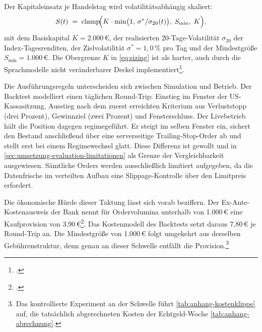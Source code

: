 Der Kapitaleinsatz je Handelstag wird volatilitätsabhängig skaliert:
\begin{equation}
  S(t) \;=\; \operatorname{clamp}\!\Bigl(K \cdot \min\bigl(1,\,
  \sigma^{*}/\sigma_{20}(t)\bigr),\; S_{\min},\; K\Bigr),
  \label{eq:sizing}
\end{equation}
mit dem Basiskapital $K = 2.000\,€$, der realisierten
20-Tage-Volatilität $\sigma_{20}$ der Index-Tagesrenditen, der Zielvolatilität
$\sigma^{*} = 1{,}0\,\%$ pro Tag und der Mindestgröße $S_{\min} = 1.000\,€$. Die
Obergrenze $K$ in \cref{eq:sizing} ist als harter, auch durch die Sprachmodelle nicht veränderbarer Deckel implementiert\footcite[zur Volatilitätssteuerung des Kapitaleinsatzes vgl.][S.~1611--1644]{moreiraMuir2017}.

Die Ausführungsregeln unterscheiden sich zwischen Simulation und Betrieb. Der Backtest
modelliert einen täglichen Round-Trip: Einstieg im Fenster der US-Kassasitzung, Ausstieg
nach dem zuerst erreichten Kriterium aus Verluststopp (drei Prozent), Gewinnziel (zwei
Prozent) und Fensterschluss. Der Livebetrieb hält die Position dagegen regimegeführt. Er
steigt im selben Fenster ein, sichert den Bestand anschließend über eine serverseitige
Trailing-Stop-Order ab und stellt erst bei einem Regimewechsel glatt. Diese Differenz ist
gewollt und in \cref{sec:umsetzung-evaluation-limitationen} als Grenze der Vergleichbarkeit
ausgewiesen. Sämtliche Orders werden ausschließlich limitiert aufgegeben, da die
Datenfrische im verteilten Aufbau eine Slippage-Kontrolle über den Limitpreis erfordert.

Die ökonomische Hürde dieser Taktung lässt sich vorab beziffern. Der Ex-Ante-Kostenausweis
der Bank nennt für Ordervolumina unterhalb von 1.000\,€ eine Kaufprovision von
3{,}90\,€\footcites[vgl.][Abschnitt~7.1.6]{comdirectSpec2020}[vgl.][Art.~24
Abs.~4]{mifid2014}. Das Kostenmodell des Backtests setzt daraus 7{,}80\,€ je Round-Trip an.
Die Mindestgröße von 1.000\,€ folgt umgekehrt aus derselben Gebührenstruktur, denn genau an dieser Schwelle entfällt die
Provision.\footnote{Das kontrollierte Experiment an der Schwelle führt
\cref{tab:anhang-kostenklippe} auf, die tatsächlich abgerechneten Kosten der
Echtgeld-Woche \cref{tab:anhang-abrechnung}.}

